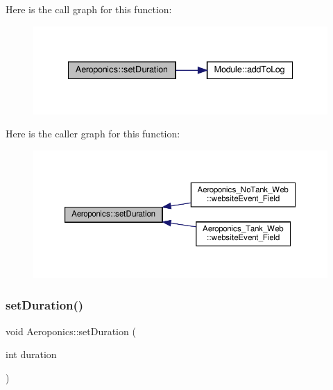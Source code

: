 Here is the call graph for this function\+:
\nopagebreak
\begin{figure}[H]
\begin{center}
\leavevmode
\includegraphics[width=335pt]{class_aeroponics_a0414c6a5be2ff2da7d88e83cc2364110_cgraph}
\end{center}
\end{figure}
Here is the caller graph for this function\+:
\nopagebreak
\begin{figure}[H]
\begin{center}
\leavevmode
\includegraphics[width=350pt]{class_aeroponics_a0414c6a5be2ff2da7d88e83cc2364110_icgraph}
\end{center}
\end{figure}
\mbox{\label{class_aeroponics_a0414c6a5be2ff2da7d88e83cc2364110}} 
\subsubsection{\texorpdfstring{set\+Duration()}{setDuration()}\hspace{0.1cm}{\footnotesize\ttfamily [2/2]}}
{\footnotesize\ttfamily void Aeroponics\+::set\+Duration (\begin{DoxyParamCaption}\item[{int}]{duration }\end{DoxyParamCaption})\hspace{0.3cm}{\ttfamily [protected]}}

